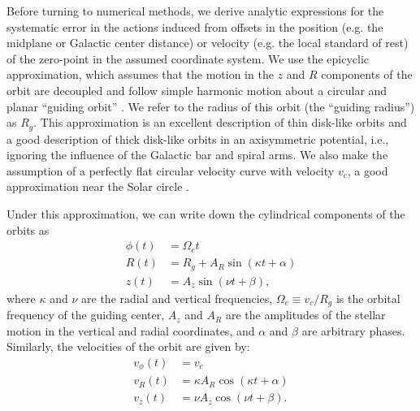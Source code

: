 \documentclass[twocolumn]{aastex62}
\newcommand{\beq}{\begin{equation}}
\newcommand{\eeq}{\end{equation}}
\begin{document}
Before turning to numerical methods, we derive analytic expressions for the
systematic error in the actions induced from offsets in the position (e.g. the midplane or
Galactic center distance) or velocity (e.g. the local standard of rest) of the zero-point in the assumed coordinate system. We use the epicyclic approximation, which
assumes that the motion in the $z$ and $R$ components of the orbit are
decoupled and follow simple harmonic motion about a circular and planar
``guiding orbit'' \citep[][Section~3.2 and references
therein]{2008gady.book.....B}. We refer to the radius of this orbit (the
``guiding radius'') as $R_g$. This approximation is an excellent description
of thin disk-like orbits and a good description of thick disk-like orbits in
an axisymmetric potential, i.e., ignoring the influence of the Galactic bar and
spiral arms. We also make the assumption of a perfectly flat circular
velocity curve with velocity $v_c$, a good approximation near the Solar circle
\citep[e.g.][]{2017MNRAS.465...76M}.

Under this approximation, we can write down the cylindrical components
of the orbits as
\beq\label{eq:orbits_epi}
\begin{split}
\phi(t) &= \Omega_c t \\
R(t) &= R_g + A_R \sin{(\kappa t + \alpha)} \\
z(t) &= A_z \sin{(\nu t + \beta)}
\text{,}
\end{split}
\eeq
where $\kappa$ and $\nu$ are the radial and vertical frequencies, $\Omega_c
\equiv v_c/R_g$ is the orbital frequency of the guiding center, $A_z$ and $A_R$ are the amplitudes of
the stellar motion in the vertical and radial coordinates, and $\alpha$ and
$\beta$ are arbitrary phases. Similarly, the velocities of the orbit are
given by:
\beq\label{eq:orbits_vel_epi}
\begin{split}
v_{\phi}(t) &= v_c \\
v_R(t) &= \kappa A_R \cos{(\kappa t + \alpha)} \\
v_z(t) &= \nu A_z \cos{(\nu t + \beta)}
\text{.}
\end{split}
\eeq
\end{document}
